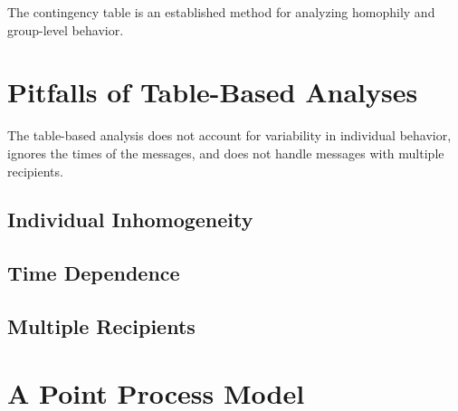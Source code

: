 \documentclass[aoas,preprint]{imsart}
\begin{document}
The contingency table is an established method for analyzing homophily and group-level behavior.

\section{Pitfalls of Table-Based Analyses}

The table-based analysis does not account for variability in individual behavior, ignores the times of the messages, and does not handle messages with multiple recipients.

\subsection{Individual Inhomogeneity}
\subsection{Time Dependence}
\subsection{Multiple Recipients}



\section{A Point Process Model}





\end{document}
